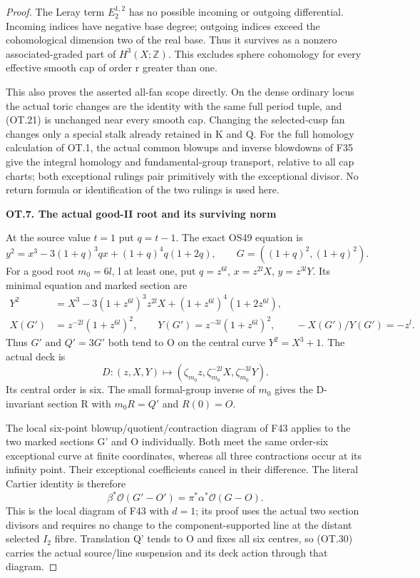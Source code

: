 \begin{proof}
The Leray term \(E_2^{1,2}\) has no possible incoming or outgoing
differential. Incoming indices have negative base degree; outgoing
indices exceed the cohomological dimension two of the real base.
Thus it survives as a nonzero associated-graded part of \(H^3(X;\mathbb Z)\).
This excludes sphere cohomology for every effective smooth cap of
order r greater than one.

This also proves the asserted all-fan scope directly. On the dense
ordinary locus the actual toric changes are the identity with the same
full period tuple, and (OT.21) is unchanged near every smooth cap.
Changing the selected-cusp fan changes only a special stalk already
retained in K and Q. For the full homology calculation of OT.1, the
actual common blowups and inverse blowdowns of F35 give the integral
homology and fundamental-group transport, relative to all cap charts;
both exceptional rulings pair primitively with the exceptional divisor.
No return formula or identification of the two rulings is used here.

\par

\medskip\noindent\textbf{OT.7. The actual good-II root and its surviving norm}

\par\nobreak

At the source value \(t=1\) put \(q=t-1\). The exact OS49 equation is
\[
 y^2=x^3-3(1+q)^3q x+(1+q)^4q(1+2q),
                       \qquad G=((1+q)^2,(1+q)^2).       \tag{OT.27}
\]
For a good root \(m_0=6l\), l at least one, put \(q=z^{6l}\),
\(x=z^{2l}X\), \(y=z^{3l}Y\). Its minimal equation and marked section are
\[
 \begin{split}
 Y^2&=X^3-3(1+z^{6l})^3z^{2l}X
                   +(1+z^{6l})^4(1+2z^{6l}),\\
 X(G')&=z^{-2l}(1+z^{6l})^2,\qquad
 Y(G')=z^{-3l}(1+z^{6l})^2,\qquad
                  -X(G')/Y(G')=-z^l .
 \end{split}                                                \tag{OT.28}
\]
Thus \(G'\text{ and }Q'=3G'\) both tend to O on the central curve
\(Y^2=X^3+1\). The actual deck is
\[
 D:(z,X,Y)\longmapsto
       (\zeta_{m_0}z,\zeta_{m_0}^{-2l}X,
                              \zeta_{m_0}^{-3l}Y).        \tag{OT.29}
\]
Its central order is six. The small formal-group inverse of
\(m_0\) gives the D-invariant section R with \(m_0R=Q'\) and \(R(0)=O\).

The local six-point blowup/quotient/contraction diagram of F43 applies
to the two marked sections G' and O individually. Both meet the same
order-six exceptional curve at finite coordinates, whereas all three
contractions occur at its infinity point. Their exceptional coefficients
cancel in their difference. The literal Cartier identity is therefore
\[
 \beta^*\mathcal O(G'-O')
               =\pi^*\alpha^*\mathcal O(G-O).             \tag{OT.30}
\]
This is the local diagram of F43 with \(d=1\); its proof uses the actual two
section divisors and requires no change to the component-supported
line at the distant selected \(I_2\) fibre. Translation Q' tends to O and
fixes all six centres, so (OT.30) carries the actual source/line
suspension and its deck action through that diagram.


\end{proof}
